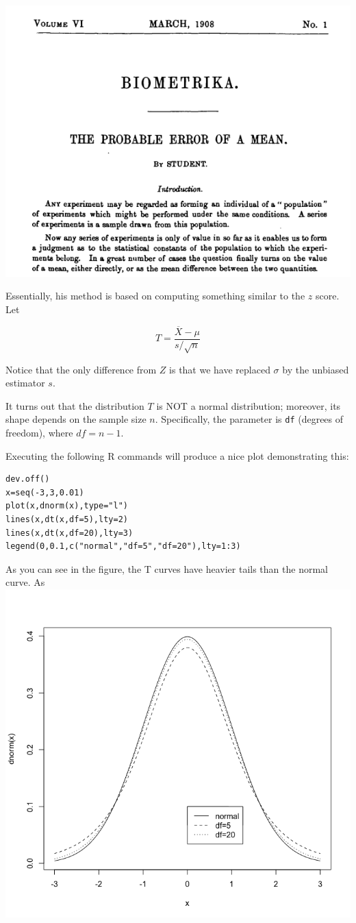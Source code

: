 \documentclass[11pt]{article}
\begin{document}
\includegraphics[width=.9\linewidth]{figures/week3/student.png}

Essentially, his method is based on computing something similar to the $z$ score.  Let

\[
T=\frac{\overline{X}-\mu}{s/\sqrt{n}}
\]

Notice that the only difference from $Z$ is that we have replaced $\sigma$ by the unbiased estimator $s$.

It turns out that the distribution $T$ is NOT a normal distribution; moreover, its shape depends on the sample size $n$.  Specifically, the parameter is \texttt{df} (degrees of freedom), where $df=n-1$.

Executing the following R commands will produce a nice plot demonstrating this:

\begin{verbatim}
dev.off()
x=seq(-3,3,0.01)
plot(x,dnorm(x),type="l")
lines(x,dt(x,df=5),lty=2)
lines(x,dt(x,df=20),lty=3)
legend(0,0.1,c("normal","df=5","df=20"),lty=1:3)
\end{verbatim}

As you can see in the figure, the T curves have heavier tails than the normal curve.  As 
\includegraphics[width=.9\linewidth]{figures/week3/tDist.png}
\end{document}
